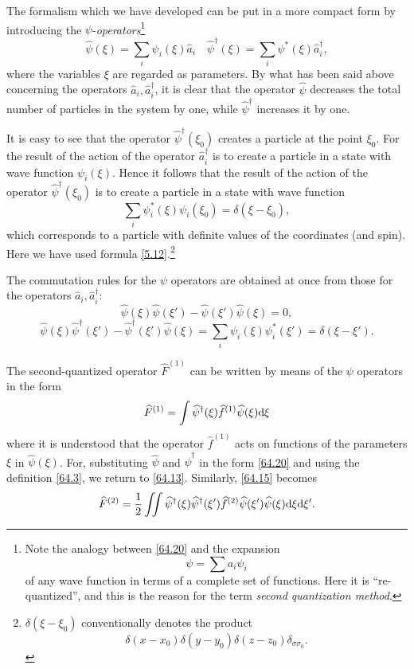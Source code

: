 The formalism which we have developed can be put in a more compact form by introducing the $\psi$-\textit{operators}\footnote{Note the analogy between \eqref{64.20} and the expansion
\[ \psi=\sum a_i\psi_i \]	
of any wave function in terms of a complete set of functions. Here it is “re-quantized”, and this is the reason for the term \textit{second quantization method}.}
\begin{equation}\label{64.20}
\hat{\psi}(\xi)=\sum_i\psi_i(\xi)\hat{a}_i\quad\hat{\psi}^\dagger(\xi)=\sum_i\psi^*(\xi)\hat{a}_i^\dagger,
\end{equation}
where the variables $\xi$ are regarded as parameters. By what has been said above concerning the operators $ \hat{a}_i, \hat{a}_i^\dagger $, it is clear that the operator $\hat{\psi}$ decreases the total number of particles in the system by one, while $\hat{\psi}^\dagger$ increases it by one.

It is easy to see that the operator $ \hat{\psi}^\dagger(\xi_0) $ creates a particle at the point $\xi_0$. For the result of the action of the operator $\hat{a}_i^\dagger$ is to create a particle in a state with wave function $\psi_i(\xi)$. Hence it follows that the result of the action of the operator $ \hat{\psi}^\dagger(\xi_0) $ is to create a particle in a state with wave function \[ \sum_i\psi_i^*(\xi)\psi_i(\xi_0)=\delta(\xi-\xi_0) , \] 
which corresponds to a particle with definite values of the coordinates (and spin). Here we have used formula \eqref{5.12}.\footnote{$ \delta(\xi-\xi_0) $ conventionally denotes the product
\[ \delta(x-x_0)\delta(y-y_0)\delta(z-z_0)\delta_{\sigma\sigma_0}. \]}

The commutation rules for the $\psi$ operators are obtained at once from those for the operators $ \hat{a}_i, \hat{a}_i^\dagger $:
\begin{equation}\label{64.21}
\hat{\psi}(\xi)\hat{\psi}(\xi')-\hat{\psi}(\xi')\hat{\psi}(\xi)=0,
\end{equation}
\begin{equation}\label{64.22}
\hat{\psi}(\xi)\hat{\psi}^\dagger(\xi')-\hat{\psi}^\dagger(\xi')\hat{\psi}(\xi)=\sum_i\psi_i(\xi)\psi_i^*(\xi')=\delta(\xi-\xi').
\end{equation}




The second-quantized operator $ \hat{F}^{(1)} $ can be written by means of the $\psi$ operators in the form
\begin{equation}\label{64.23}
\widehat{F}^{(1)}=\int\widehat{\psi}^\dagger(\xi)\widehat{f}^{(1)}\widehat{\psi}(\xi)\mathrm{d}\xi
\end{equation}
where it is understood that the operator $ \hat{f}^{(1)} $ acts on functions of the parameters $\xi$ in $\hat{\psi}(\xi)$. For, substituting $\hat{\psi}$ and $\hat{\psi}^\dagger$ in the form \eqref{64.20} and using the definition \eqref{64.3}, we return to \eqref{64.13}. Similarly, \eqref{64.15} becomes
\begin{equation}\label{64.24}
\widehat{F}^{(2)}=\frac{1}{2}\iint\widehat{\psi}^\dagger(\xi)\widehat{\psi}^\dagger(\xi')\widehat{f}^{(2)}\widehat{\psi}(\xi')\widehat{\psi}(\xi)\mathrm{d}\xi\mathrm{d}\xi'.
\end{equation}



